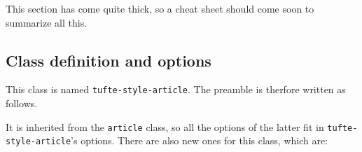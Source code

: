 \documentclass[
	raggedright,
	twoside,
	12pt,
	colorful,
]{tufte-style-article}
\begin{document}
This section has come quite thick, so a cheat sheet should come soon to summarize all this.

\subsection{Class definition and options}

This class is named \texttt{tufte-style-article}. The preamble is therfore written as follows.

It is inherited from the \texttt{article} class, so all the options of the latter fit in \texttt{tufte-style-article}'s options. There are also new ones for this class, which are:
\end{document}
